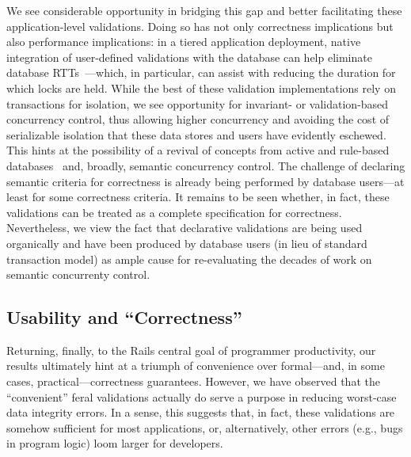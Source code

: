 We see considerable opportunity in bridging this gap and better
facilitating these application-level validations. Doing so has not
only correctness implications but also performance implications: in a
tiered application deployment, native integration of user-defined
validations with the database can help eliminate database
RTTs~\cite{pyxis}---which, in particular, can assist with reducing the
duration for which locks are held. While the best of these validation
implementations rely on transactions for isolation, we see opportunity
for invariant- or validation-based concurrency control, thus allowing
higher concurrency and avoiding the cost of serializable isolation
that these data stores and users have evidently eschewed. This hints
at the possibility of a revival of concepts from active and rule-based
databases~\cite{activedb-book} and, broadly, semantic concurrency
control. The challenge of declaring semantic criteria for correctness
is already being performed by database users---at least for some
correctness criteria. It remains to be seen whether, in fact, these
validations can be treated as a complete specification for
correctness. Nevertheless, we view the fact that declarative
validations are being used organically and have been produced by
database users (in lieu of standard transaction model) as ample cause
for re-evaluating the decades of work on semantic concurrenty control.

\subsection{Usability and ``Correctness''}

Returning, finally, to the Rails central goal of programmer
productivity, our results ultimately hint at a triumph of convenience
over formal---and, in some cases, practical---correctness
guarantees. However, we have observed that the ``convenient''
feral validations actually do serve a purpose in reducing worst-case
data integrity errors. In a sense, this suggests that, in fact, these
validations are somehow sufficient for most applications, or,
alternatively, other errors (e.g., bugs in program logic) loom larger for developers.

